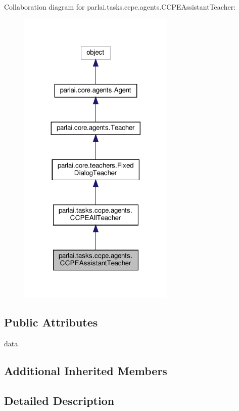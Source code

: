 Collaboration diagram for parlai.\+tasks.\+ccpe.\+agents.\+C\+C\+P\+E\+Assistant\+Teacher\+:
\nopagebreak
\begin{figure}[H]
\begin{center}
\leavevmode
\includegraphics[width=212pt]{d2/d60/classparlai_1_1tasks_1_1ccpe_1_1agents_1_1CCPEAssistantTeacher__coll__graph}
\end{center}
\end{figure}
\subsection*{Public Attributes}
\begin{DoxyCompactItemize}
\item 
\hyperlink{classparlai_1_1tasks_1_1ccpe_1_1agents_1_1CCPEAssistantTeacher_aeb95d397c64b27bdd7d99270a86ca190}{data}
\end{DoxyCompactItemize}
\subsection*{Additional Inherited Members}


\subsection{Detailed Description}


